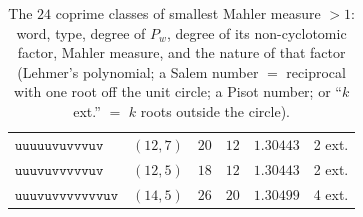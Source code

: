 \begin{table}[h]
\begin{tabular}{@{}llcccl@{}}
$\mathtt{uuuuuvuvvvuv}$ & $(12,7)$ & $20$ & $12$ & $1.30443$ & 2 ext. \\
$\mathtt{uuuvuvvvvvuv}$ & $(12,5)$ & $18$ & $12$ & $1.30443$ & 2 ext. \\
$\mathtt{uuuvuvvvvvvvuv}$ & $(14,5)$ & $26$ & $20$ & $1.30499$ & 4 ext. \\
\bottomrule
\end{tabular}
\caption{The $24$ coprime classes of smallest Mahler measure $>1$: word, type, degree of
$P_w$, degree of its non-cyclotomic factor, Mahler measure, and the nature of that factor
(Lehmer's polynomial; a Salem number $=$ reciprocal with one root off the unit circle; a
Pisot number; or ``$k$ ext.'' $=$ $k$ roots outside the circle).}\label{tab:highlights}
\end{table}
